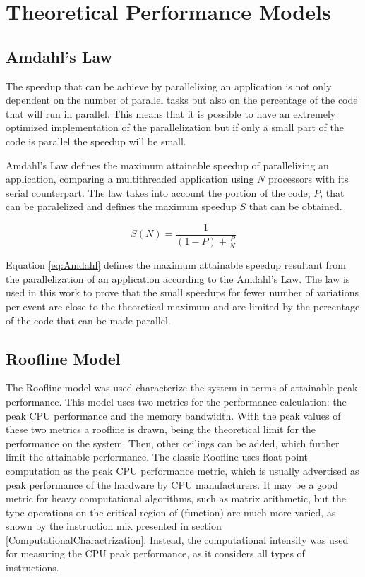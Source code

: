 \appendix
{}
\chapter{Theoretical Performance Models}

\section{Amdahl's Law}
\label{AmdahlsLaw}

The speedup that can be achieve by parallelizing an application is not only dependent on the number of parallel tasks but also on the percentage of the code that will run in parallel. This means that it is possible to have an extremely optimized implementation of the parallelization but if only a small part of the code is parallel the speedup will be small.

Amdahl's Law \cite{AMDAHL} defines the maximum attainable speedup of parallelizing an application, comparing a multithreaded application using $N$ processors with its serial counterpart. The law takes into account the portion of the code, $P$, that can be paralelized and defines the maximum speedup $S$ that can be obtained.

\begin{center}
	\begin{equation}
		S(N) = \frac{1}{(1 - P) + \frac{P}{N}}
		\label{eq:Amdahl}
	\end{equation}
\end{center}

Equation \ref{eq:Amdahl} defines the maximum attainable speedup resultant from the parallelization of an application according to the Amdahl's Law. The law is used in this work to prove that the small speedups for fewer number of variations per event are close to the theoretical maximum and are limited by the percentage of the code that can be made parallel.

\section{Roofline Model}
\label{App:Roofline}

The Roofline model \cite{Roofline} was used characterize the system in terms of attainable peak performance. This model uses two metrics for the performance calculation: the peak CPU performance and the memory bandwidth. With the peak values of these two metrics a roofline is drawn, being the theoretical limit for the performance on the system. Then, other ceilings can be added, which further limit the attainable performance. The classic Roofline uses float point computation as the peak CPU performance metric, which is usually advertised as peak performance of the hardware by CPU manufacturers. It may be a good metric for heavy computational algorithms, such as matrix arithmetic, but the type operations on the critical region of \tth (\ttDilepKinFit function) are much more varied, as shown by the instruction mix presented in section \ref{ComputationalCharactrization}. Instead, the computational intensity was used for measuring the CPU peak performance, as it considers all types of instructions.

